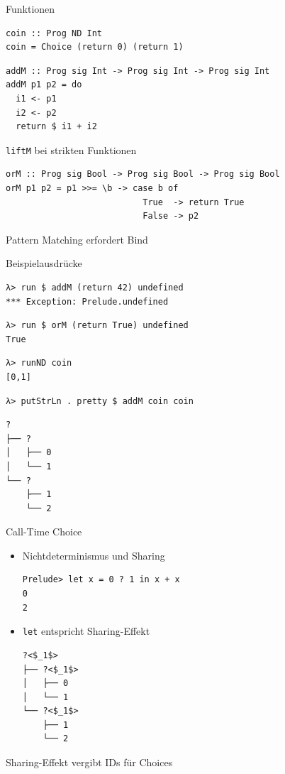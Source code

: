 \documentclass{beamer}
\newcommand{\haskellinline}[1]{\texttt{#1}}
\begin{document}
\begin{frame}[fragile]{Funktionen}
\begin{verbatim}
coin :: Prog ND Int
coin = Choice (return 0) (return 1)
\end{verbatim}
\pause
\begin{verbatim}
addM :: Prog sig Int -> Prog sig Int -> Prog sig Int
addM p1 p2 = do
  i1 <- p1
  i2 <- p2
  return $ i1 + i2
\end{verbatim}
\MVRightArrow{} \haskellinline{liftM} bei strikten Funktionen
\pause
\begin{verbatim}
orM :: Prog sig Bool -> Prog sig Bool -> Prog sig Bool
orM p1 p2 = p1 >>= \b -> case b of
                           True  -> return True
                           False -> p2
\end{verbatim}
\MVRightArrow{} Pattern Matching erfordert Bind
\end{frame}
\begin{frame}[fragile]{Beispielausdrücke}
\begin{verbatim}
λ> run $ addM (return 42) undefined
*** Exception: Prelude.undefined
\end{verbatim}
\begin{verbatim}
λ> run $ orM (return True) undefined
True
\end{verbatim}
\begin{verbatim}
λ> runND coin
[0,1]
\end{verbatim}
\pause
\begin{verbatim}
λ> putStrLn . pretty $ addM coin coin
\end{verbatim}
\vspace*{-3pt}
\begin{verbatim}
?
├── ?
│   ├── 0
│   └── 1
└── ?
    ├── 1
    └── 2
\end{verbatim}
\end{frame}

\begin{frame}[fragile]{Call-Time Choice}
\begin{itemize}
\item Nichtdeterminismus und \alert{Sharing}
\begin{verbatim}
Prelude> let x = 0 ? 1 in x + x
0
2
\end{verbatim}
\item \haskellinline{let} entspricht Sharing-Effekt
\begin{verbatim}
?<$_1$>
├── ?<$_1$>
│   ├── 0
│   └── 1
└── ?<$_1$>
    ├── 1
    └── 2
\end{verbatim}
\end{itemize}
\MVRightArrow{} Sharing-Effekt vergibt \alert{IDs} für Choices
\end{frame}
\end{document}
